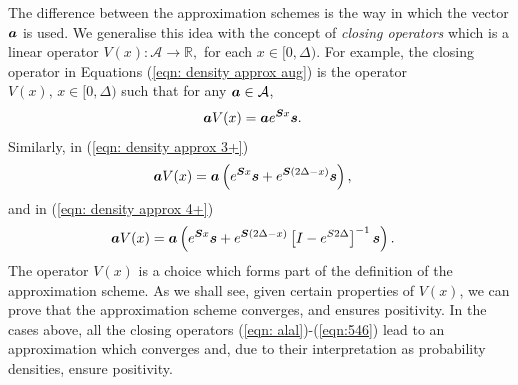 The difference between the approximation schemes is the way in which the vector \(\boldsymbol a\) is used. We generalise this idea with the concept of \emph{closing operators} which is a linear operator \(V(x):\mathcal A \to \mathbb R,\) for each \(x\in[0,\Delta)\). For example, the closing operator in Equations (\ref{eqn: density approx aug}) is the operator \(V(x),\,x\in[0,\Delta)\) such that for any \(\boldsymbol a \in \mathcal A\), 
\begin{align}
	\boldsymbol a V(x) &= \boldsymbol a e^{\boldsymbol Sx}\boldsymbol s.\label{eqn: alal}
\end{align}
Similarly, in (\ref{eqn: density approx 3+})
\begin{align}
	\boldsymbol a V(x) &= \boldsymbol a \left(e^{ \boldsymbol{S}x} \boldsymbol s + e^{ \boldsymbol{S}(2\Delta-x)} \boldsymbol s\right),\label{eqn:546}
\end{align}
and in (\ref{eqn: density approx 4+})
\begin{align}
	\boldsymbol a V(x) &= \boldsymbol a \left(e^{ \boldsymbol{S}x} \boldsymbol s + e^{ \boldsymbol{S}(2\Delta-x)}\left[I-e^{S2\Delta}\right]^{-1} \boldsymbol s\right).\label{eqn:5462}
\end{align}
The operator \(V(x)\) is a choice which forms part of the definition of the approximation scheme. As we shall see, given certain properties of \(V(x)\), we can prove that the approximation scheme converges, and ensures positivity. In the cases above, all the closing operators (\ref{eqn: alal})-(\ref{eqn:546}) lead to an approximation which converges and, due to their interpretation as probability densities, ensure positivity. 


